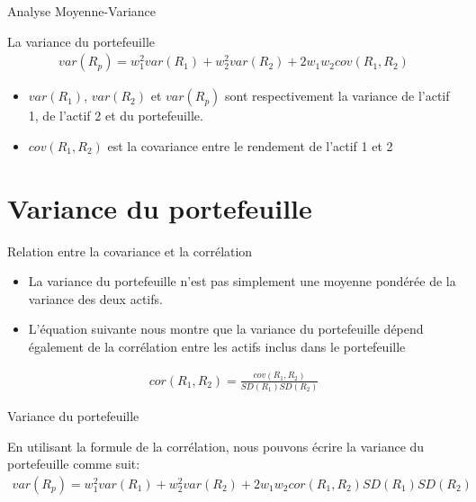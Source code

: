 \documentclass[10pt,a4paper]{beamer}
\begin{document}
\begin{frame}{Analyse Moyenne-Variance}
\begin{block}{La variance du portefeuille}
\begin{align*}
var(R_p) = w_1^2 var(R_1) + w_2^2 var(R_2) + 2 w_1 w_2 cov(R_1, R_2)
\end{align*}
\end{block}
\vspace{0.5cm}
\begin{itemize}[label=\bullet]
\item $var(R_1)$, $var(R_2)$ et $var(R_p)$ sont respectivement la variance de l'actif 1, de l'actif 2 et du portefeuille.
\item $cov(R_1, R_2)$ est la covariance entre le rendement de l'actif 1 et 2
\end{itemize}
\end{frame}


\section{Variance du portefeuille}

\begin{frame}{Relation entre la covariance et la corrélation}
\begin{itemize}[label=\bullet]
\item La variance du portefeuille n'est pas simplement une moyenne pondérée de la variance des deux actifs.
\item L’équation suivante nous montre que la variance du portefeuille dépend également de la corrélation entre les actifs inclus dans le portefeuille 
\end{itemize}
\begin{align*}
cor(R_1,R_2)=\frac{cov(R_1,R_2)}{SD(R_1)SD(R_2)}
\end{align*}
\end{frame}

\begin{frame}{Variance du portefeuille}

En utilisant la formule de la corrélation, nous pouvons écrire la variance du portefeuille comme suit:
\vspace{0.5cm}
\begin{align*}
var(R_p) = w_1^2 var(R_1) + w_2^2 var(R_2) + 2 w_1 w_2 cor(R_1,R_2)SD(R_1)SD(R_2)
\end{align*}
\end{frame}
\end{document}
